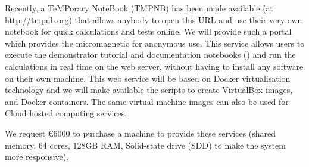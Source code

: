 \begin{workpackage}
\begin{tasklist}
\begin{task}[lead=XFEL,id=oommf-nb-ve,title=Online portal for
  micromagnetic VRE demonstrator,PM=3,partners={SR,FAU},wphases=25-28,issue=82]
  Recently, a TeMPorary \Jupyter NoteBook (TMPNB) has been made
  available (at \href{http://tmpnb.org}{http://tmpnb.org}) that allows
  anybody to open this URL and use their very own \Jupyter notebook
  for quick calculations and tests online. We will provide such a
  portal which provides the
  micromagnetic \VRE for anonymous use. This service allows users to
  execute the demonstrator tutorial and documentation notebooks
  () and run the
  calculations in real time on the web server, without having to
  install any software on their own machine.  This web service will be
  based on Docker \cite{Docker} virtualisation technology and we will
  make available the scripts to create VirtualBox \cite{Virtualbox}
  images, and Docker containers. The same virtual machine images can
  also be used for Cloud hosted computing services.


  We request \euro{6000} to purchase a machine to provide these
  services (shared memory, 64 cores, 128GB RAM, Solid-state drive (SDD)
  to make the system more responsive).
\end{task}

\end{tasklist}


\end{workpackage}
